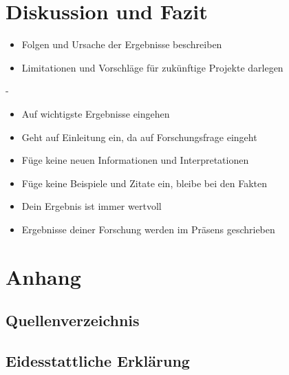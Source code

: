 \documentclass[a4paper,12pt,oneside]{article}
\begin{document}
  \section{Diskussion und Fazit}
    \begin{itemize}
      \item Folgen und Ursache der Ergebnisse beschreiben
      \item Limitationen und Vorschläge für zukünftige Projekte darlegen
    \end{itemize}
    -
    \begin{itemize}
      \item Auf wichtigste Ergebnisse eingehen
      \item Geht auf Einleitung ein, da auf Forschungsfrage eingeht
      \item Füge keine neuen Informationen und Interpretationen
      \item Füge keine Beispiele und Zitate ein, bleibe bei den Fakten
      \item Dein Ergebnis ist immer wertvoll
      \item Ergebnisse deiner Forschung werden im Präsens geschrieben
    \end{itemize}
  \section{Anhang}
    \subsection{Quellenverzeichnis}
      \printbibliography
    \subsection{Eidesstattliche Erklärung} 
\end{document}
